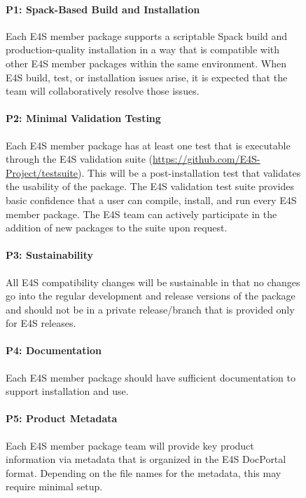 \begin{figure}[h!]
\begin{mdframed}
\vspace{12pt}

\paragraph{P1: Spack-Based Build and Installation} Each E4S member package supports a scriptable Spack build and production-quality installation in a way that is compatible with other E4S member packages within the same environment. When E4S build, test, or installation issues arise, it is expected that the team will collaboratively resolve those issues.
\vspace{12pt}

\paragraph{P2: Minimal Validation Testing} Each E4S member package has at least one test that is executable through the E4S validation suite (\url{https://github.com/E4S-Project/testsuite}). This will be a post-installation test that validates the usability of the package. The E4S validation test suite provides basic confidence that a user can compile, install, and run every E4S member package. The E4S team can actively participate in the addition of new packages to the suite upon request.
\vspace{12pt}

\paragraph{P3: Sustainability} All E4S compatibility changes will be sustainable in that no changes go into the regular development and release versions of the package and should not be in a private release/branch that is provided only for E4S releases.
\vspace{12pt}

\paragraph{P4: Documentation} Each E4S member package should have sufficient documentation to support installation and use.
\vspace{12pt}

\paragraph{P5: Product Metadata} Each E4S member package team will provide key product information via metadata that is organized in the E4S DocPortal format. Depending on the file names for the metadata, this may require minimal setup.
\vspace{12pt}


\end{mdframed}
\end{figure}
